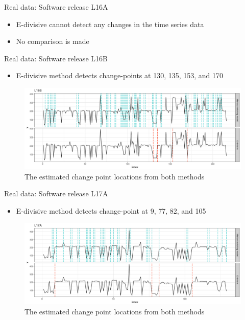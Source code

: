 \documentclass{beamer}
\begin{document}
\begin{frame}[fragile]
\end{frame}

\begin{frame}
Real data: Software release L16A

\begin{itemize}
	\item E-divisive cannot detect any changes in the time series data
	\item No comparison is made
\end{itemize}

\end{frame}
\begin{frame}
Real data: Software release L16B

\begin{itemize}
	\item E-divisive method detects change-points at 130, 135, 153, and 170
\end{itemize}

\begin{figure}
	\includegraphics[width=1\linewidth]{compare_L16B}
	\caption{The estimated change point locations from both methods}
\end{figure}

\end{frame}
\begin{frame}
Real data: Software release L17A

\begin{itemize}
	\item E-divisive method detects change-point at 9, 77, 82, and 105
\end{itemize}

\begin{figure}
	\includegraphics[width=1\linewidth]{compare_L17A}
	\caption{The estimated change point locations from both methods}
\end{figure}
\end{frame}
\end{document}
